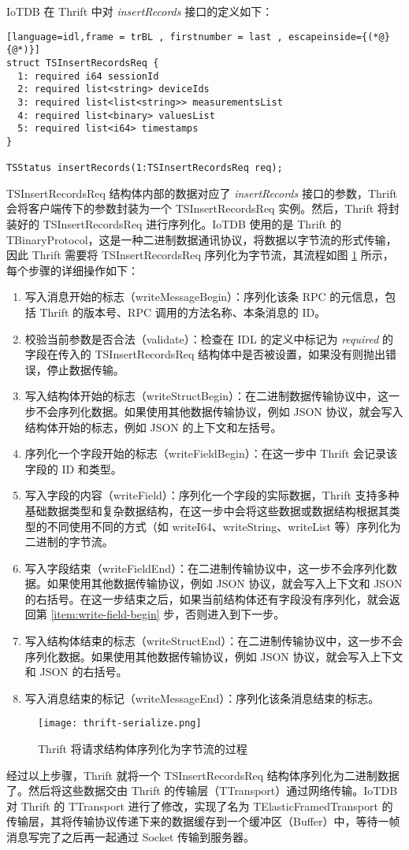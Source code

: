 IoTDB 在 Thrift 中对 \emph{insertRecords} 接口的定义如下：
\begin{lstlisting}[language=idl,frame = trBL , firstnumber = last , escapeinside={(*@}{@*)}]
struct TSInsertRecordsReq {
  1: required i64 sessionId
  2: required list<string> deviceIds
  3: required list<list<string>> measurementsList
  4: required list<binary> valuesList
  5: required list<i64> timestamps
}

TSStatus insertRecords(1:TSInsertRecordsReq req);
\end{lstlisting}
TSInsertRecordsReq 结构体内部的数据对应了 \emph{insertRecords} 接口的参数，Thrift 会将客户端传下的参数封装为一个 TSInsertRecordsReq 实例。然后，Thrift 将封装好的 TSInsertRecordsReq 进行序列化。IoTDB 使用的是 Thrift 的 TBinaryProtocol，这是一种二进制数据通讯协议，将数据以字节流的形式传输，因此 Thrift 需要将 TSInsertRecordsReq 序列化为字节流，其流程如图 \ref{fig:thrift-serialize} 所示，每个步骤的详细操作如下：
\begin{enumerate}
  \item 写入消息开始的标志（writeMessageBegin）：序列化该条 RPC 的元信息，包括 Thrift 的版本号、RPC 调用的方法名称、本条消息的 ID。
  \item 校验当前参数是否合法（validate）：检查在 IDL 的定义中标记为 \emph{required} 的字段在传入的 TSInsertRecordsReq 结构体中是否被设置，如果没有则抛出错误，停止数据传输。
  \item 写入结构体开始的标志（writeStructBegin）：在二进制数据传输协议中，这一步不会序列化数据。如果使用其他数据传输协议，例如 JSON 协议，就会写入结构体开始的标志，例如 JSON 的上下文和左括号。
  \item\label{item:write-field-begin}  序列化一个字段开始的标志（writeFieldBegin）：在这一步中 Thrift 会记录该字段的 ID 和类型。
  \item 写入字段的内容（writeField）：序列化一个字段的实际数据，Thrift 支持多种基础数据类型和复杂数据结构，在这一步中会将这些数据或数据结构根据其类型的不同使用不同的方式（如 writeI64、writeString、writeList 等）序列化为二进制的字节流。
  \item 写入字段结束（writeFieldEnd）：在二进制传输协议中，这一步不会序列化数据。如果使用其他数据传输协议，例如 JSON 协议，就会写入上下文和 JSON 的右括号。在这一步结束之后，如果当前结构体还有字段没有序列化，就会返回第 \ref{item:write-field-begin} 步，否则进入到下一步。
  \item 写入结构体结束的标志（writeStructEnd）：在二进制传输协议中，这一步不会序列化数据。如果使用其他数据传输协议，例如 JSON 协议，就会写入上下文和 JSON 的右括号。
  \item 写入消息结束的标记（writeMessageEnd）：序列化该条消息结束的标志。
\end{enumerate}
\begin{figure}
  \centering
  \texttt{[image: thrift-serialize.png]}
  \caption{Thrift 将请求结构体序列化为字节流的过程}
  \label{fig:thrift-serialize}
\end{figure}
经过以上步骤，Thrift 就将一个 TSInsertRecordsReq 结构体序列化为二进制数据了。然后将这些数据交由 Thrift 的传输层（TTransport）通过网络传输。IoTDB 对 Thrift 的 TTransport 进行了修改，实现了名为 TElasticFramedTransport 的传输层，其将传输协议传递下来的数据缓存到一个缓冲区（Buffer）中，等待一帧消息写完了之后再一起通过 Socket 传输到服务器。

